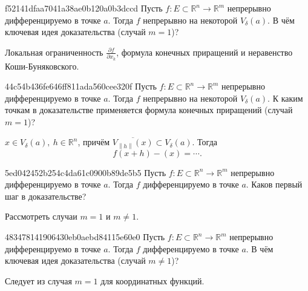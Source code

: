 \begin{note}{f52141dfaa7041a38ae0b120a0b3dccd}
    Пусть \({ f : E \subset \mathbb R^{n} \to \mathbb R^{m} }\) непрерывно дифференцируемо в точке \({ a }\).
    Тогда \({ f }\) непрерывно на некоторой \({ V_{\delta}(a) }\).
    В чём ключевая идея доказательства (случай \({ m = 1 }\))?

    \begin{cloze}{1}
        Локальная ограниченность \({ \frac{\partial f}{\partial x_k} }\), формула конечных приращений и неравенство Коши-Буняковского.
    \end{cloze}
\end{note}

\begin{note}{44c54b436fe646ff811ada560cee320f}
    Пусть \({ f : E \subset \mathbb R^{n} \to \mathbb R^{m} }\) непрерывно дифференцируемо в точке \({ a }\).
    Тогда \({ f }\) непрерывно на некоторой \({ V_{\delta}(a) }\).
    К каким точкам в доказательстве применяется формула конечных приращений (случай \({ m = 1 }\))?

    \begin{cloze}{1}
        \({ x \in V_{\delta}(a),\: h \in \mathbb R^{n} }\), причём \({ \overline{V_{\left\lVert h \right\rVert}(x)} \subset V_{\delta}(a) }\).
        Тогда
        \[
            f(x + h) - (x) = \cdots.
        \]
    \end{cloze}
\end{note}

\begin{note}{5ed042452b254c4da61c0900b89de5b5}
    Пусть \({ f : E \subset \mathbb R^{n} \to \mathbb R^{m} }\) непрерывно дифференцируемо в точке \({ a }\).
    Тогда \({ f }\) дифференцируемо в точке \({ a }\).
    Каков первый шаг в доказательстве?

    \begin{cloze}{1}
        Рассмотреть случаи \({ m = 1 }\) и \({ m \neq 1 }\).
    \end{cloze}
\end{note}

\begin{note}{483478141906430eb0aebd84115e60e0}
    Пусть \({ f : E \subset \mathbb R^{n} \to \mathbb R^{m} }\) непрерывно дифференцируемо в точке \({ a }\).
    Тогда \({ f }\) дифференцируемо в точке \({ a }\).
    В чём ключевая идея доказательства (случай \({ m \neq 1 }\))?

    \begin{cloze}{1}
        Следует из случая \({ m = 1 }\) для координатных функций.
    \end{cloze}
\end{note}

